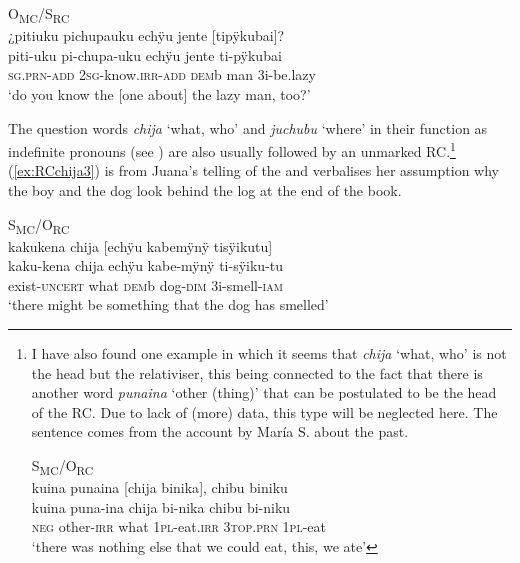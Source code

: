 \ea\label{ex:headed-RC-3}
\begingl
\glpreamble \textup{O\textsubscript{MC}/S\textsubscript{RC}}\\¿pitiuku pichupauku echÿu jente \textup{[}tipÿkubai\textup{]}?\\
\gla piti-uku pi-chupa-uku echÿu jente ti-pÿkubai \\
\textsc{sg.prn}-\textsc{add} 2\textsc{sg}-know.\textsc{irr}-\textsc{add} \textsc{dem}b man 3i-be.lazy\\
\glft ‘do you know the [one about] the lazy man, too?’
\endgl
\trailingcitation{[mox-n110920l.001]}
\xe

The question words \textit{chija} ‘what, who’ and \textit{juchubu} ‘where’ in their function as indefinite pronouns (see ) are also usually followed by an unmarked RC.\footnote{\label{fn:chija}I have also found one example in which it seems that \textit{chija} ‘what, who’ is not the head but the relativiser, this being connected to the fact that there is another word \textit{punaina} ‘other (thing)’ that can be postulated to be the head of the RC. Due to lack of (more) data, this type will be neglected here. The sentence comes from the account by María S. about the past.

\ea\label{ex:RC-chija1}
\begingl
\glpreamble \textup{S\textsubscript{MC}/O\textsubscript{RC}}\\kuina punaina \textup{[}chija binika\textup{]}, chibu biniku\\
\gla kuina puna-ina chija bi-nika chibu bi-niku\\
\glb \textsc{neg} other-\textsc{irr} what 1\textsc{pl}-eat.\textsc{irr} 3\textsc{top.prn} 1\textsc{pl}-eat\\
\glft ‘there was nothing else that we could eat, this, we ate’
\endgl
\trailingcitation{[rxx-p181101l-2.247]}
\xe} (\ref{ex:RCchija3}) is from Juana’s telling of the  and verbalises her assumption why the boy and the dog look behind the log at the end of the book.

\ea\label{ex:RCchija3}
\begingl
\glpreamble \textup{S\textsubscript{MC}/O\textsubscript{RC}}\\kakukena chija \textup{[}echÿu kabemÿnÿ tisÿikutu\textup{]}\\
\gla kaku-kena chija echÿu kabe-mÿnÿ ti-sÿiku-tu\\
\glb exist-\textsc{uncert} what \textsc{dem}b dog-\textsc{dim} 3i-smell-\textsc{iam}\\
\glft ‘there might be something that the dog has smelled’
\endgl
\trailingcitation{[jxx-a120516l-a.409]}
\xe


